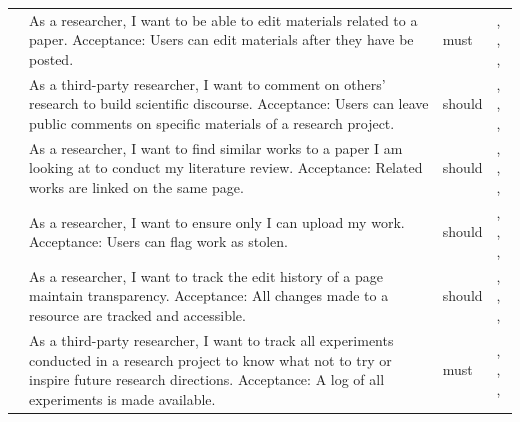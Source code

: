 \begin{tabularx}{\linewidth}{L{1.9cm}YL{1.8cm}L{3.4cm}}
 &
As a researcher, I want to be able to edit materials related to a paper. Acceptance: Users can edit materials after they have be posted. &
\gls{must} &
,    , ,  \\ %

 &
As a third-party researcher, I want to comment on others' research to build scientific discourse. Acceptance: Users can leave public comments on specific materials of a research project. &
\gls{should} &
,    , ,  \\ %

 &
As a researcher, I want to find similar works to a paper I am looking at to conduct my literature review. Acceptance: Related works are linked on the same page. &
\gls{should} &
,    , ,  \\ %

 &
As a researcher, I want to ensure only I can upload my work. Acceptance: Users can flag work as stolen. &
\gls{should} &
,    , ,  \\ %

 &
As a researcher, I want to track the edit history of a page maintain transparency. Acceptance: All changes made to a resource are tracked and accessible. &
\gls{should} &
,    , ,  \\

 &
As a third-party researcher, I want to track all experiments conducted in a research project to know what not to try or inspire future research directions. Acceptance: A log of all experiments is made available.&
\gls{must} &
,    , ,  \\ %


\end{tabularx}
